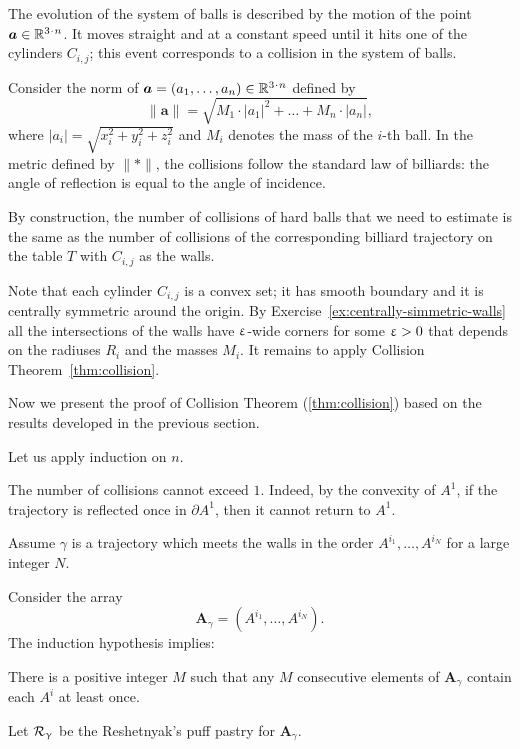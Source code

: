 The evolution of the system
of balls is described by the motion of
the point $\bm{a}\in\RR^{3\cdot n}$.
It moves straight and at a
constant speed until it hits one of the cylinders $C_{i,j}$; 
this event corresponds
to a collision in the system of balls.

Consider the norm of $\bm{a}=(a_1,\dots,a_n)\in \RR^{3\cdot n}$ defined by
\[\lVert \bm{a}\rVert=\sqrt{M_1\cdot|a_1|^2+\dots+M_n\cdot |a_n|},\]
where $|a_i|=\sqrt{x_i^2+y_i^2+z_i^2}$ 
and $M_i$ denotes the mass of the $i$-th ball.
In the metric defined by $\lVert {*}\rVert$,
the collisions follow the
standard law of billiards: 
the angle of reflection is equal to the angle
of incidence. 

By construction, the number of collisions of hard balls that we need to estimate 
is the same as the number of collisions of the corresponding billiard trajectory on the table $T$ with $C_{i,j}$ as the walls.

Note that each cylinder $C_{i,j}$ is a convex set;
it has smooth boundary 
and it is centrally symmetric around the origin.
By Exercise~\ref{ex:centrally-simmetric-walls} all the intersections of the walls have $\upvarepsilon$-wide corners for some $\upvarepsilon>0$ that depends on the radiuses $R_i$ and the masses $M_i$.
It remains to apply Collision Theorem~\ref{thm:collision}.
\qeds

Now we present the proof of Collision Theorem (\ref{thm:collision})
based on the results developed in the previous section.

Let us apply induction on $n$.

The number of collisions cannot exceed $1$.  
Indeed, by the convexity of $A^1$,
if the trajectory is reflected once in $\partial A^1$, 
then it cannot return to $A^1$. 

Assume $\gamma$ is a trajectory which meets the walls in the order $A^{i_1},\dots,A^{i_N}$ for a large integer $N$.

Consider the array 
\[\bm{A}_\gamma=(A^{i_1},\dots,A^{i_N}).\]
The induction hypothesis implies:

\begin{clm}{}\label{clm:collision-induction hypothesis}
There is a positive integer $M$ 
such that any $M$ 
consecutive elements of
$\bm{A}_\gamma$ contain each $A^i$ at least once.
\end{clm}

Let $\mathcal{R}_\upgamma $ be  the  Reshetnyak's puff pastry for  $\bm{A}_\gamma$.

